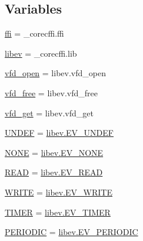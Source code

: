 \subsection*{Variables}
\begin{DoxyCompactItemize}
\item 
\hyperlink{namespacegevent_1_1libev_1_1corecffi_af89a707ff3aa9e40fa3aa88254f61c41}{ffi} = \+\_\+corecffi.\+ffi
\item 
\hyperlink{namespacegevent_1_1libev_1_1corecffi_a57e0063f18b58bb7c8be58dc997eadfe}{libev} = \+\_\+corecffi.\+lib
\item 
\hyperlink{namespacegevent_1_1libev_1_1corecffi_a60f2301d1937593654138b9ce5ada51c}{vfd\+\_\+open} = libev.\+vfd\+\_\+open
\item 
\hyperlink{namespacegevent_1_1libev_1_1corecffi_a8c403de2e3c7e04069fc1e47d87ad3a3}{vfd\+\_\+free} = libev.\+vfd\+\_\+free
\item 
\hyperlink{namespacegevent_1_1libev_1_1corecffi_a84b7178744810cdb645648d93d1c7b48}{vfd\+\_\+get} = libev.\+vfd\+\_\+get
\item 
\hyperlink{namespacegevent_1_1libev_1_1corecffi_afbf0393a681151da2ec919d6147e9df7}{U\+N\+D\+EF} = \hyperlink{libev_2__corecffi__cdef_8c_a46e455c3c21712e0e4b9f08babbf98cf}{libev.\+E\+V\+\_\+\+U\+N\+D\+EF}
\item 
\hyperlink{namespacegevent_1_1libev_1_1corecffi_a4ec4a3214836877a0323e9fa3cdec3d3}{N\+O\+NE} = \hyperlink{libev_2__corecffi__cdef_8c_a0307c9d093060e148ecca1c7cfb02429}{libev.\+E\+V\+\_\+\+N\+O\+NE}
\item 
\hyperlink{namespacegevent_1_1libev_1_1corecffi_a89194dcc20823034f2ea160fb4fa7514}{R\+E\+AD} = \hyperlink{libev_2__corecffi__cdef_8c_a74bbaf2d529670cc0ab793497b41700f}{libev.\+E\+V\+\_\+\+R\+E\+AD}
\item 
\hyperlink{namespacegevent_1_1libev_1_1corecffi_a91875074f91e97a3278c52d7079dc40a}{W\+R\+I\+TE} = \hyperlink{libev_2__corecffi__cdef_8c_a2a31813fa3b26bf2d150512cbbf893f7}{libev.\+E\+V\+\_\+\+W\+R\+I\+TE}
\item 
\hyperlink{namespacegevent_1_1libev_1_1corecffi_a1ab21f610aba302de27906b0cd628e47}{T\+I\+M\+ER} = \hyperlink{libev_2__corecffi__cdef_8c_ad7d21e1e404df682f124dde57d951a56}{libev.\+E\+V\+\_\+\+T\+I\+M\+ER}
\item 
\hyperlink{namespacegevent_1_1libev_1_1corecffi_ac3e3b70a8e005e33b26c1336af4e3aaf}{P\+E\+R\+I\+O\+D\+IC} = \hyperlink{libev_2__corecffi__cdef_8c_a9b690b2c035bbce516c16888a7c0b3db}{libev.\+E\+V\+\_\+\+P\+E\+R\+I\+O\+D\+IC}
\item 

\end{DoxyCompactItemize}
